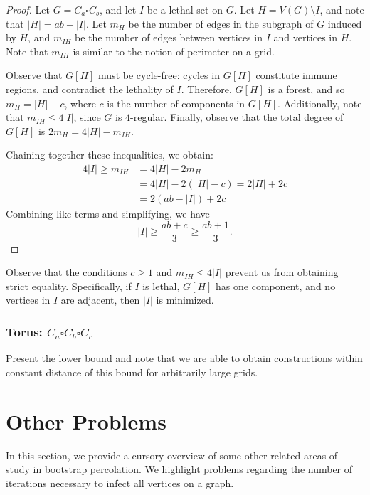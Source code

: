 \begin{proof}
Let $G = C_a \square C_b$, and let $I$ be a lethal set on $G$. Let $H = V(G) \setminus I$, and note that $|H| = ab - |I|$. Let $m_{H}$ be the number of edges in the subgraph of $G$ induced by $H$, and $m_{IH}$ be the number of edges between vertices in $I$ and vertices in $H$. Note that $m_{IH}$ is similar to the notion of perimeter on a grid.

Observe that $G[H]$ must be cycle-free: cycles in $G[H]$ constitute immune regions, and contradict the lethality of $I$. Therefore, $G[H]$ is a forest, and so $m_H = |H| - c$, where $c$ is the number of components in $G[H]$. Additionally, note that $m_{IH} \leq 4|I|$, since $G$ is $4$-regular. Finally, observe that the total degree of $G[H]$ is $2m_H = 4|H| - m_{IH}$.

Chaining together these inequalities, we obtain:
\begin{align*}
4|I| \geq m_{IH} &= 4|H| - 2m_H \\
&= 4|H| - 2(|H| -c) = 2|H| + 2c \\
&= 2(ab-|I|) + 2c
\end{align*}
Combining like terms and simplifying, we have
$$|I| \geq \frac{ab +c}{3} \geq \frac{ab +1}{3}.$$
\end{proof}

Observe that the conditions $c \geq 1$ and $m_{IH} \leq 4|I|$ prevent us from obtaining strict equality. Specifically, if $I$ is lethal, $G[H]$ has one component, and no vertices in $I$ are adjacent, then $|I|$ is minimized. 

\subsubsection{Torus: $C_a \square C_b \square C_c$}

Present the lower bound and note that we are able to obtain constructions within constant distance of this bound for arbitrarily large grids.

\section{Other Problems}

In this section, we provide a cursory overview of some other related areas of study in bootstrap percolation. We highlight problems regarding the number of iterations necessary to infect all vertices on a graph.

